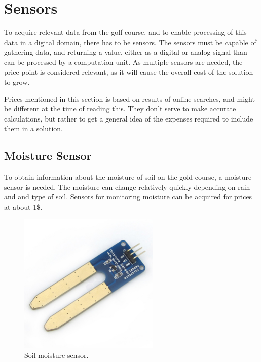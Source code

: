 \section{Sensors}
To acquire relevant data from the golf course, and to enable processing of this data in a digital domain, there has to be sensors. The sensors must be capable of gathering data, and returning a value, either as a digital or analog signal than can be processed by a computation unit. As multiple sensors are needed, the price point is considered relevant, as it will cause the overall cost of the solution to grow.

Prices mentioned in this section is based on results of online searches, and might be different at the time of reading this. They don't serve to make accurate calculations, but rather to get a general idea of the expenses required to include them in a solution.

\subsection{Moisture Sensor}
To obtain information about the moisture of soil on the gold course, a moisture sensor is needed. The moisture can change relatively quickly depending on rain and and type of soil. Sensors for monitoring moisture can be acquired for prices at about 1\$.%

\begin{figure}[H]
\centering
\includegraphics[width=0.6\textwidth]{chapters/analysis/figs/soilMoistureSensor.jpg}
\caption{Soil moisture sensor.}
\label{fig:moistureSensor}
\end{figure}

